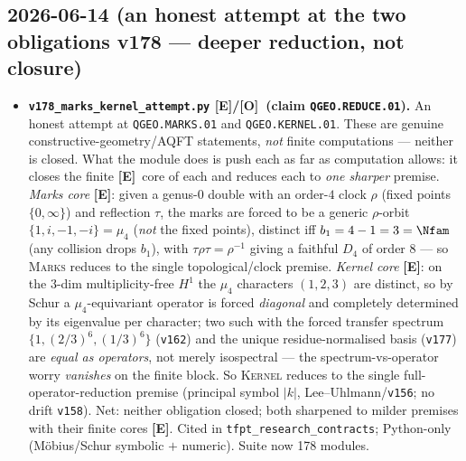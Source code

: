 \documentclass[11pt]{article}
\providecommand{\mE}{\textbf{[E]}}\providecommand{\mC}{\textbf{[C]}}
\providecommand{\mO}{\textbf{[O]}}\providecommand{\mX}{\textbf{[X]}}
\providecommand{\vref}[1]{\texttt{#1}}
\begin{document}
\subsection*{2026-06-14 (an honest attempt at the two obligations v178 --- deeper reduction, not closure)}
\begin{itemize}
\item \textbf{\texttt{v178\_marks\_kernel\_attempt.py} \mE/\mO\ (claim \texttt{QGEO.REDUCE.01}).} An
  honest attempt at \texttt{QGEO.MARKS.01} and \texttt{QGEO.KERNEL.01}. These are genuine
  constructive-geometry/AQFT statements, \emph{not} finite computations --- neither is closed. What
  the module does is push each as far as computation allows: it closes the finite \mE\ core of each
  and reduces each to \emph{one sharper} premise. \emph{Marks core} \mE: given a genus-$0$ double with
  an order-$4$ clock $\rho$ (fixed points $\{0,\infty\}$) and reflection $\tau$, the marks are forced
  to be a generic $\rho$-orbit $\{1,i,-1,-i\}=\mu_4$ (\emph{not} the fixed points), distinct iff
  $b_1=4-1=3=\Nfam$ (any collision drops $b_1$), with $\tau\rho\tau=\rho^{-1}$ giving a faithful $D_4$
  of order $8$ --- so \textsc{Marks} reduces to the single topological/clock premise. \emph{Kernel
  core} \mE: on the $3$-dim multiplicity-free $H^1$ the $\mu_4$ characters $(1,2,3)$ are distinct, so
  by Schur a $\mu_4$-equivariant operator is forced \emph{diagonal} and completely determined by its
  eigenvalue per character; two such with the forced transfer spectrum $\{1,(2/3)^6,(1/3)^6\}$
  (\vref{v162}) and the unique residue-normalised basis (\vref{v177}) are \emph{equal as operators},
  not merely isospectral --- the spectrum-vs-operator worry \emph{vanishes} on the finite block. So
  \textsc{Kernel} reduces to the single full-operator-reduction premise (principal symbol $|k|$,
  Lee--Uhlmann/\vref{v156}; no drift \vref{v158}). Net: neither obligation closed; both sharpened to
  milder premises with their finite cores \mE. Cited in \texttt{tfpt\_research\_contracts}; Python-only
  (M\"obius/Schur symbolic $+$ numeric). Suite now 178 modules.
\end{itemize}
\end{document}
